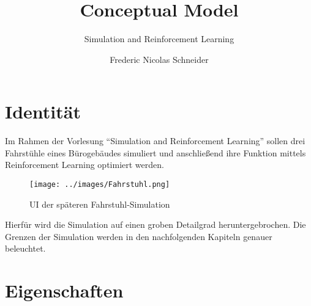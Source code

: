 \documentclass[envcountsame, envcountchap, deutsch]{i-studis}
\begin{document}
\title{Conceptual Model}
\subtitle{Simulation and Reinforcement Learning}

\author{Frederic Nicolas Schneider}


\address{Trier}


\mytitlepage

\frontmatter
\tableofcontents										%


\mainmatter
\newpage

\hypertarget{identituxe4t}{%
\chapter{Identität}\label{identituxe4t}}

Im Rahmen der Vorlesung ``Simulation and Reinforcement Learning'' sollen
drei Fahrstühle eines Bürogebäudes simuliert und anschließend ihre
Funktion mittels Reinforcement Learning optimiert werden.

\begin{figure}
\centering
\texttt{[image: ../images/Fahrstuhl.png]}
\caption{UI der späteren Fahrstuhl-Simulation}
\end{figure}

Hierfür wird die Simulation auf einen groben Detailgrad
heruntergebrochen. Die Grenzen der Simulation werden in den
nachfolgenden Kapiteln genauer beleuchtet.

\hypertarget{eigenschaften}{%
\chapter{Eigenschaften}\label{eigenschaften}}
\end{document}
